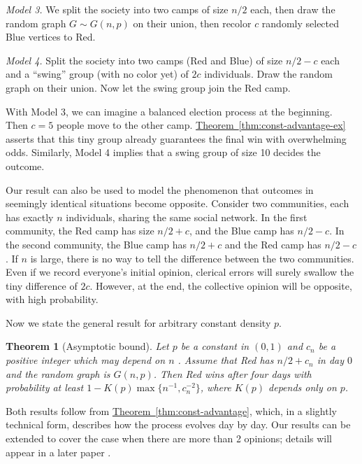 \documentclass[11pt]{article}
\numberwithin{equation}{section}
\newtheorem{theorem}{Theorem}[section]
\theoremstyle{definition}
\theoremstyle{plain}
\newcommand{\expref}[2]{\hyperref[#2]{#1~\ref{#2}}}
\begin{document}
			\emph{Model 3.} We split the society into two camps of size $n/2$ each, then draw the random graph $G\sim G(n, p)$ on their union, then recolor $c$
			randomly selected  %
			Blue vertices to Red.
			
			\emph{Model 4.} Split the society into two camps (Red and Blue) of size $n/2-c$ each and a ``swing'' group (with no color yet) of $2c$ individuals. Draw the random graph on their union. Now let the swing group join the Red camp.
			
			With Model 3, we can imagine a balanced election process at the beginning. Then $c = 5$ people move to the other camp. \expref{Theorem}{thm:const-advantage-ex} asserts that this tiny group already %
			guarantees  %
			the final win with %
			overwhelming odds. Similarly, Model 4 implies that a swing group of size 10 decides the outcome.
			
			Our result can also be used to model the phenomenon that outcomes  in seemingly identical
			situations become opposite. Consider two communities, each has exactly $n$ individuals, sharing the same social network. In the first community,
			the  %
			Red camp  has
			size $n/2 +c$, and
			the  %
			Blue camp has $n/2-c$. In the second community,
			the  %
			Blue camp has $n/2+c$ and
			the  %
			Red camp has $n/2-c$. If $n$ is large,
			there is no way to tell the difference between the two communities.
			Even if we record everyone's initial opinion,  clerical errors will surely swallow the tiny difference
			of $2c$.  However, at the end, the collective opinion  will be opposite, with high probability.
			
			
			Now we state the general result for arbitrary constant density $p$.
			
			\begin{theorem}[Asymptotic bound] \label{thm:unbounded-advantage}
				Let $p$ be a constant in $(0, 1)$ and $c_n$ be a positive integer which may depend on $n$
				.
				Assume that Red has $n/2 +c_n$ in day $0$ and the random graph is $G(n,p)$.
				Then Red wins after four days with probability at least $1 - K(p) \max \{n^{-1}, c_n^{-2} \} $, where $K(p)$ depends only on $p$.
			\end{theorem}
			
			Both  results follow from \expref{Theorem}{thm:const-advantage},  which, in a slightly technical form, describes how the process evolves day by day.
			Our results can be extended to cover the case when there are more than 2 opinions; details will appear in a later paper \cite{TranVusparse}.
			
\end{document}

